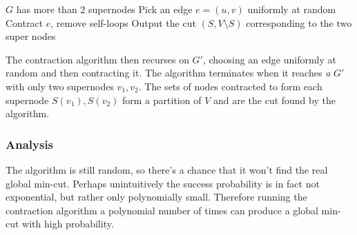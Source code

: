 \documentclass[../notes.tex]{subfiles}
\begin{document}
\begin{codebox}
\li \While $ G $ has more than 2 supernodes \Do
\li Pick an edge $ e = (u,v) $ uniformly at random
\li Contract $ e $, remove self-loops \End
\li Output the cut $ (S, V \setminus S )$ corresponding to the two super nodes
\end{codebox}

The contraction algorithm then recurses on $ G' $, choosing an edge uniformly at random and then contracting it. 
The algorithm terminates when it reaches \textit{a} $ G' $ with only two supernodes $ v_1, v_2 $. 
The sets of nodes contracted to form each supernode $ S(v_1), S(v_2) $ form a partition of $ V $ and are the cut found by the algorithm.



\subsubsection{Analysis}

The algorithm is still random, so there's a chance that it won't find the real global min-cut.
Perhaps unintuitively the success probability is in fact not exponential, but rather only polynomially small.
Therefore running the contraction algorithm a polynomial number of times can produce a global min-cut with high probability.
\end{document}
